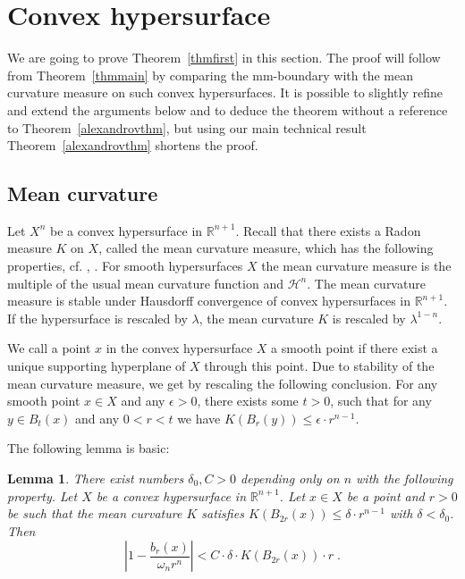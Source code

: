 \documentclass[12pt,leqno]{amsart}
\numberwithin{equation}{section}
\newtheorem{lem}[thm]{Lemma}
\theoremstyle{definition}
\theoremstyle{remark}
\newcommand{\tref}[1]{Theorem~\ref{#1}}
\newcommand{\R}{\mathbb{R}}
\begin{document}
\section{Convex hypersurface} \label{sec:hyper}
We are going to prove \tref{thmfirst} in this section. The proof will follow from \tref{thmmain} by comparing the mm-boundary with the mean curvature measure on such convex hypersurfaces.
It is possible to slightly refine and extend  the arguments below and to deduce the theorem without a reference to \tref{alexandrovthm}, but using  our main technical result \tref{alexandrovthm}
shortens the proof.
\subsection{Mean curvature}
Let $X^n$ be a  convex hypersurface in $\R ^{n+1}$.  Recall that there exists a Radon measure $K$ on $X$, called the mean curvature measure, which has the following properties, cf. \cite{Schneider}, \cite{Fedcurvature}.
For smooth hypersurfaces $X$ the mean curvature measure is the multiple of the usual mean curvature function and $\mathcal H^n$.  The mean curvature measure is stable under Hausdorff convergence of convex hypersurfaces in $\R^{n+1}$. If the hypersurface is rescaled by $\lambda$, the mean curvature $K$ is rescaled by $\lambda ^{1-n}$.

We call a point $x$ in the convex hypersurface $X$ a smooth point if there exist a unique supporting hyperplane of $X$ through this point.
Due to stability of the mean curvature measure, we get by rescaling the following conclusion.
For any smooth point $x\in X$ and any $\epsilon >0$, there exists some $t>0$, such that
for any $y\in B_{t} (x)$ and any $0<r<t$ we have $K(B_r(y))  \leq \epsilon \cdot r^{n-1}$.








The following lemma is basic:

\begin{lem}  \label{lem:mean}
There exist numbers $\delta _0,C>0$ depending only on $n$ with the following property. Let $X$ be a convex hypersurface in $\R^{n+1}$.
Let $x\in X$ be a point and $r>0$ be such that the mean curvature $K$ satisfies  $K(B_{2r} (x))  \leq \delta \cdot r^{n-1}$ with $\delta <\delta _0$.
Then $$| 1 -  \frac {b_r (x)} { \omega _n r^n}| <C\cdot \delta \cdot K( B_{2r} (x)) \cdot r \; .$$
\end{lem}
\end{document}
